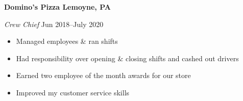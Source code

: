 \textbf{Domino's Pizza \hfill  Lemoyne, PA} \par
\textit{Crew Chief} \hfill Jun 2018--July 2020 \par
\begin{itemize}
	\item Managed employees \& ran shifts
	\item Had responsibility over opening \& closing shifts and cashed out drivers
	\item Earned two employee of the month awards for our store
	\item Improved my customer service skills
\end{itemize} \par
